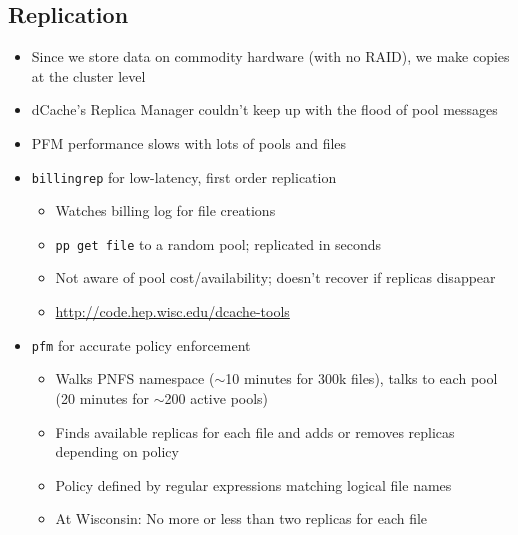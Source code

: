 \documentclass{beamer}
\newcommand{\ca}{\ensuremath{\sim}}
\begin{document}
\subsection{Replication}
\begin{frame}
\begin{itemize}
	\item Since we store data on commodity hardware (with no RAID), we make copies at the cluster level
	\item dCache's Replica Manager couldn't keep up with the flood of pool messages
	\item PFM performance slows with lots of pools and files
	\item {\tt billingrep} for low-latency, first order replication
	\begin{itemize}
		\item Watches billing log for file creations
		\item {\tt pp get file} to a random pool; replicated in seconds
		\item Not aware of pool cost/availability; doesn't recover if replicas disappear
		\item \url{http://code.hep.wisc.edu/dcache-tools}
	\end{itemize}
	\item {\tt pfm} for accurate policy enforcement
	\begin{itemize}
		\item Walks PNFS namespace (\ca{}10 minutes for 300k files), talks to each pool (20 minutes for \ca{}200 active pools)
		\item Finds available replicas for each file and adds or removes replicas depending on policy
		\item Policy defined by regular expressions matching logical file names
		\item At Wisconsin: No more or less than two replicas for each file
	\end{itemize}
\end{itemize}
\end{frame}
\end{document}
